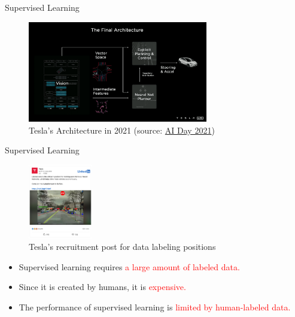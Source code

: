 \documentclass[8pt, aspectratio=169]{beamer} %
\begin{document}

\begin{frame}{\insertsubsectionhead}{Supervised Learning}

  \vspace{0.5cm}

  {
    \begin{figure}
      \includegraphics[width=0.7\textwidth]{figures/tesla-architecture.png}
      \caption{Tesla's Architecture in 2021 (source: \href{https://www.youtube.com/live/j0z4FweCy4M?si=vEB4egdqDOVpmpLu}{AI Day 2021})}
    \end{figure}
  }
\end{frame}

\begin{frame}{\insertsubsectionhead}{Supervised Learning}

  {
    \begin{figure}
      \includegraphics[width=0.25\textwidth]{figures/tesla-label.png}
      \caption{Tesla’s recruitment post for data labeling positions}
    \end{figure}

    {
      \begin{itemize}
        \item <2-> Supervised learning requires \textcolor{red}{a large amount of labeled data.}
        \item <3-> Since it is created by humans, it is \textcolor{red}{expensive.}
        \item <4-> The performance of supervised learning is \textcolor{red}{limited by human-labeled data.}
      \end{itemize}
    }
  }

\end{frame}
\end{document}
